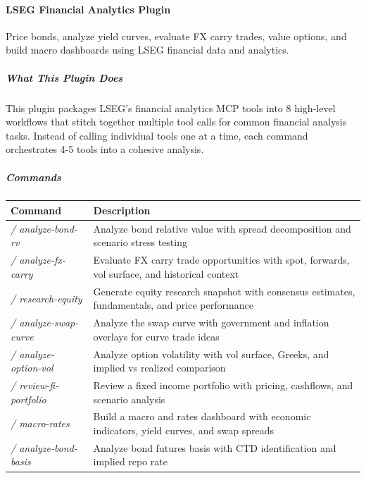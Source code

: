 \documentclass[11pt]{article}
\begin{document}
\paragraph{LSEG Financial Analytics Plugin}\mbox{}\par

Price bonds, analyze yield curves, evaluate FX carry trades, value options, and build macro dashboards using LSEG financial data and analytics.


\subparagraph{What This Plugin Does}\mbox{}\par

This plugin packages LSEG's financial analytics MCP tools into 8 high-level workflows that stitch together multiple tool calls for common financial analysis tasks. Instead of calling individual tools one at a time, each command orchestrates 4-5 tools into a cohesive analysis.


\subparagraph{Commands}\mbox{}\par

\begingroup
\small
\setlength{\tabcolsep}{2pt}
\begin{longtable}{>{\RaggedRight\arraybackslash\hspace{0pt}}p{}>{\RaggedRight\arraybackslash\hspace{0pt}}p{}}
\toprule
{} \textbf{Command} & \textbf{Description} \\
\midrule
{} \emph{/ analyze-bond-rv} & Analyze bond relative value with spread decomposition and scenario stress testing \\
{} \emph{/ analyze-fx-carry} & Evaluate FX carry trade opportunities with spot, forwards, vol surface, and historical context \\
{} \emph{/ research-equity} & Generate equity research snapshot with consensus estimates, fundamentals, and price performance \\
{} \emph{/ analyze-swap-curve} & Analyze the swap curve with government and inflation overlays for curve trade ideas \\
{} \emph{/ analyze-option-vol} & Analyze option volatility with vol surface, Greeks, and implied vs realized comparison \\
{} \emph{/ review-fi-portfolio} & Review a fixed income portfolio with pricing, cashflows, and scenario analysis \\
{} \emph{/ macro-rates} & Build a macro and rates dashboard with economic indicators, yield curves, and swap spreads \\
{} \emph{/ analyze-bond-basis} & Analyze bond futures basis with CTD identification and implied repo rate \\
\bottomrule
\end{longtable}
\endgroup
\end{document}
